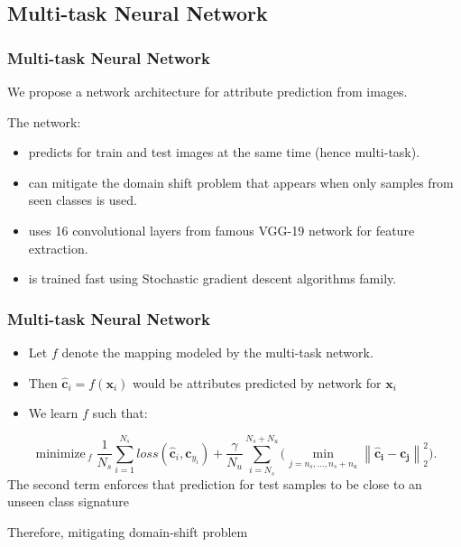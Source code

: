 \documentclass{beamer}
\DeclareMathOperator*{\minimize}{minimize\,}
\newcommand{\normtwo}[1]{\left \lVert #1 \right \rVert_2^2}
\begin{document}
\subsection{Multi-task Neural Network}
\begin{frame}\frametitle{Multi-task Neural Network}
  We propose a network architecture for attribute prediction from images.

  The network:
\begin{itemize}
  \item  predicts for train and test images at the same time (hence multi-task).
  \item can mitigate the domain shift problem that appears when only samples from seen classes is used.
  \item uses 16 convolutional layers from famous VGG-19 network \cite{vgg}  for feature extraction.
  \item is trained fast using Stochastic gradient descent algorithms family.
\end{itemize}
\end{frame}

\begin{frame}\frametitle{Multi-task Neural Network}
\begin{itemize}
\item[] Let $f$ denote the mapping modeled by the multi-task network.
\item[] Then  $\mathbf{\hat{c}}_i = f (\mathbf{x}_i) $ would be attributes predicted by network for $\mathbf{x}_i$
\item[] We learn $f$ such that:
\end{itemize}
  \begin{equation}
\label{eq:nn_loss}
\minimize_{f}
\frac{1}{N_s} \sum_{i=1}^{N_s} loss(\mathbf{\hat{c}}_i, \mathbf{c}_{y_i}) +
\frac{\gamma}{N_u} \sum_{i=N_s}^{N_s+N_u} \Big ( \min_{j=n_s,\ldots,n_s + n_u} \normtwo{\mathbf{\hat{c}_i - c_j}} \Big ).
\end{equation}
The second term enforces that prediction for test samples to be close to an unseen class signature

Therefore, mitigating domain-shift problem
\end{frame}
\end{document}
